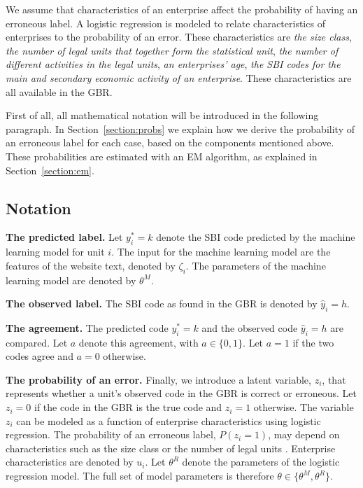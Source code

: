 \documentclass[12pt, a4paper, titlepage]{article}
\begin{document}
We assume that characteristics of an enterprise affect the probability of having an erroneous label. A logistic regression is modeled to relate characteristics of enterprises to the probability of an error. These characteristics are \textit{the size class}, \textit{the number of legal units that together form the statistical unit}, \textit{the number of different activities in the legal units}, \textit{an enterprises' age}, \textit{the SBI codes for the main and secondary economic activity of an enterprise}. These characteristics are all available in the GBR.
\bigskip

First of all, all mathematical notation will be introduced in the following paragraph. In Section~\ref{section:probs} we explain how we derive the probability of an erroneous label for each case, based on the components mentioned above. These probabilities are estimated with an EM algorithm, as explained in Section~\ref{section:em}.

							\subsection{Notation}

\textbf{The predicted label.} Let $y^*_i = k$ denote the SBI code predicted by the machine learning model for unit $i$. The input for the machine learning model are the features of the website text, denoted by $\zeta_i$. The parameters of the machine learning model are denoted by $\theta^M$. 

\textbf{The observed label.} The SBI code as found in the GBR is denoted by $\hat{y}_i = h$. 

\textbf{The agreement.} The predicted code $y^*_i = k$ and the observed code  $\hat{y}_i = h$ are compared. Let $a$ denote this agreement, with $a \in \{0,1\}$. Let $a=1$ if the two codes agree and $a=0$ otherwise.

\textbf{The probability of an error.} Finally, we introduce a latent variable, $z_i$, that represents whether a unit's observed code in the GBR is correct or erroneous. Let $z_i = 0$ if the code in the GBR is the true code and $z_i = 1$ otherwise. The variable $z_i$ can be modeled as a function of enterprise characteristics using logistic regression. The probability of an erroneous label, $P(z_i = 1)$, may depend on characteristics such as the size class or the number of legal units \citep{DeldenScholtusBurger}. Enterprise characteristics are denoted by  $u_i$. Let $\theta^R$ denote the parameters of the logistic regression model.
The full set of model parameters is therefore $\theta \in \{ \theta^M, \theta^R\}$. 
\end{document}
